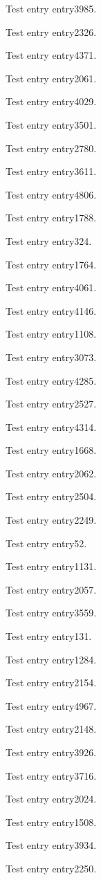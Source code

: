 Test entry \gls{entry3985}.

Test entry \gls{entry2326}.

Test entry \gls{entry4371}.

Test entry \gls{entry2061}.

Test entry \gls{entry4029}.

Test entry \gls{entry3501}.

Test entry \gls{entry2780}.

Test entry \gls{entry3611}.

Test entry \gls{entry4806}.

Test entry \gls{entry1788}.

Test entry \gls{entry324}.

Test entry \gls{entry1764}.

Test entry \gls{entry4061}.

Test entry \gls{entry4146}.

Test entry \gls{entry1108}.

Test entry \gls{entry3073}.

Test entry \gls{entry4285}.

Test entry \gls{entry2527}.

Test entry \gls{entry4314}.

Test entry \gls{entry1668}.

Test entry \gls{entry2062}.

Test entry \gls{entry2504}.

Test entry \gls{entry2249}.

Test entry \gls{entry52}.

Test entry \gls{entry1131}.

Test entry \gls{entry2057}.

Test entry \gls{entry3559}.

Test entry \gls{entry131}.

Test entry \gls{entry1284}.

Test entry \gls{entry2154}.

Test entry \gls{entry4967}.

Test entry \gls{entry2148}.

Test entry \gls{entry3926}.

Test entry \gls{entry3716}.

Test entry \gls{entry2024}.

Test entry \gls{entry1508}.

Test entry \gls{entry3934}.

Test entry \gls{entry2250}.

